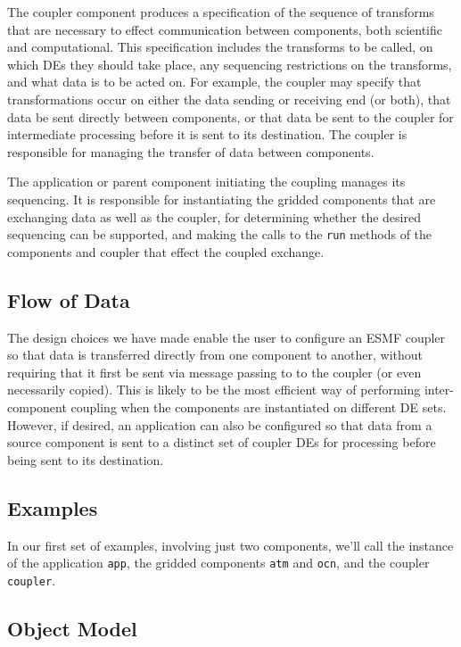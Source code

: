 The coupler component produces a specification of the sequence of 
transforms that are necessary to effect communication between components, 
both scientific and computational.  This specification includes the 
transforms to be
called, on which DEs they should take place, any sequencing restrictions 
on the transforms, and what data is to be acted on.  For example, the
coupler may specify that transformations occur on either the data sending 
or receiving end (or both), that data be sent directly between components,
or that data be sent to the coupler for intermediate processing before 
it is sent to its destination.  The coupler is responsible for managing
the transfer of data between components.    

The application or parent component initiating the coupling manages 
its sequencing.  It is responsible for instantiating the gridded components
that are exchanging data as well as the coupler, for determining whether the 
desired sequencing can be supported, and making the calls to the {\tt run} 
methods of the components and coupler that effect the coupled exchange. 

\subsection{Flow of Data}

The design choices we have made enable the user to configure an ESMF
coupler so that data is transferred directly from one component to another, 
without requiring that it first be sent via message passing to to the
coupler (or even necessarily
copied).  This is likely to be the most efficient way of performing 
inter-component coupling when the components are instantiated on different
DE sets.  However, if desired, an application can also be configured so that
data from a source component is sent to a distinct set of coupler 
DEs for processing before being sent to its destination.

\subsection{Examples}

In our first set of examples, involving just two components, we'll call 
the instance of the application {\tt app}, the gridded components {\tt atm} 
and {\tt ocn}, and the coupler {\tt coupler}.

\subsection{Object Model}

